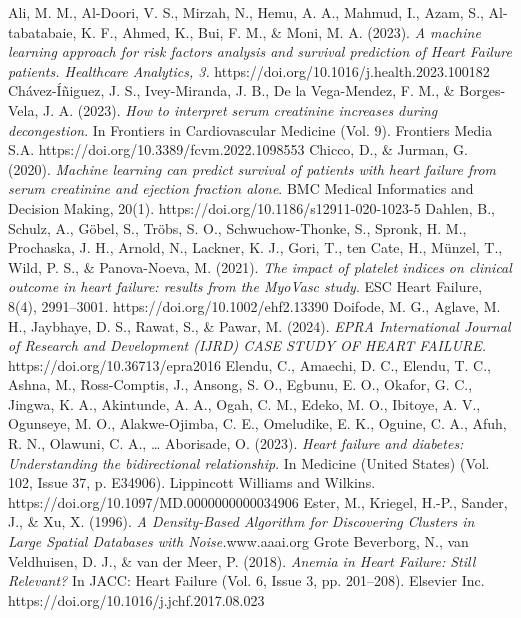 \documentclass[english,12pt,a4paper,openany]{book}
\begin{document}
	\begin{thebibliography}{9}  
		Ali, M. M., Al-Doori, V. S., Mirzah, N., Hemu, A. A., Mahmud, I., Azam, S., Al-tabatabaie, K. F., Ahmed, K., Bui, F. M., \& Moni, M. A. (2023). \textit{A machine learning approach for risk factors analysis and survival prediction of Heart Failure patients. Healthcare Analytics, 3.} https://doi.org/10.1016/j.health.2023.100182
		Chávez-Íñiguez, J. S., Ivey-Miranda, J. B., De la Vega-Mendez, F. M., \& Borges-Vela, J. A. (2023). \textit{How to interpret serum creatinine increases during decongestion}. In Frontiers in Cardiovascular Medicine (Vol. 9). Frontiers Media S.A. https://doi.org/10.3389/fcvm.2022.1098553
		Chicco, D., \& Jurman, G. (2020). \textit{Machine learning can predict survival of patients with heart failure from serum creatinine and ejection fraction alone}. BMC Medical Informatics and Decision Making, 20(1). https://doi.org/10.1186/s12911-020-1023-5
		Dahlen, B., Schulz, A., Göbel, S., Tröbs, S. O., Schwuchow-Thonke, S., Spronk, H. M., Prochaska, J. H., Arnold, N., Lackner, K. J., Gori, T., ten Cate, H., Münzel, T., Wild, P. S., \& Panova-Noeva, M. (2021). \textit{The impact of platelet indices on clinical outcome in heart failure: results from the MyoVasc study}. ESC Heart Failure, 8(4), 2991–3001. https://doi.org/10.1002/ehf2.13390
		Doifode, M. G., Aglave, M. H., Jaybhaye, D. S., Rawat, S., \& Pawar, M. (2024). \textit{EPRA International Journal of Research and Development (IJRD) CASE STUDY OF HEART FAILURE.} https://doi.org/10.36713/epra2016
		Elendu, C., Amaechi, D. C., Elendu, T. C., Ashna, M., Ross-Comptis, J., Ansong, S. O., Egbunu, E. O., Okafor, G. C., Jingwa, K. A., Akintunde, A. A., Ogah, C. M., Edeko, M. O., Ibitoye, A. V., Ogunseye, M. O., Alakwe-Ojimba, C. E., Omeludike, E. K., Oguine, C. A., Afuh, R. N., Olawuni, C. A., … Aborisade, O. (2023). \textit{Heart failure and diabetes: Understanding the bidirectional relationship}. In Medicine (United States) (Vol. 102, Issue 37, p. E34906). Lippincott Williams and Wilkins. https://doi.org/10.1097/MD.0000000000034906
		Ester, M., Kriegel, H.-P., Sander, J., \& Xu, X. (1996). \textit{A Density-Based Algorithm for Discovering Clusters in Large Spatial Databases with Noise.}www.aaai.org 
		Grote Beverborg, N., van Veldhuisen, D. J., \& van der Meer, P. (2018). \textit{Anemia in Heart Failure: Still Relevant?} In JACC: Heart Failure (Vol. 6, Issue 3, pp. 201–208). Elsevier Inc. https://doi.org/10.1016/j.jchf.2017.08.023

\end{thebibliography}
\end{document}

